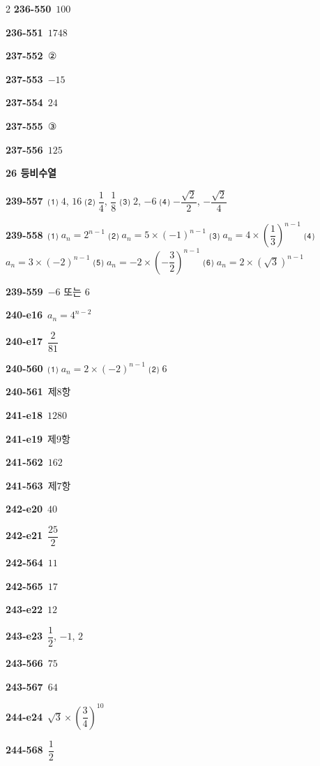 \documentclass[10pt,a4paper]{article}
\begin{document}
\begin{multicols}{2}
\noindent\textbf{236-550}\ $100$\par
\noindent\textbf{236-551}\ $1748$\par
\noindent\textbf{237-552}\ ②\par
\noindent\textbf{237-553}\ $-15$\par
\noindent\textbf{237-554}\ $24$\par
\noindent\textbf{237-555}\ ③\par
\noindent\textbf{237-556}\ $125$\par
\noindent\textbf{26 등비수열}\par\smallskip
\noindent\textbf{239-557}\ ⑴ $4$, $16$ ⑵ $\dfrac{1}{4}$, $\dfrac{1}{8}$ ⑶ $2$, $-6$ ⑷ $-\dfrac{\sqrt{2}}{2}$, $-\dfrac{\sqrt{2}}{4}$\par
\noindent\textbf{239-558}\ ⑴ $a_n=2^{n-1}$ ⑵ $a_n=5\times(-1)^{n-1}$ ⑶ $a_n=4\times\left(\dfrac{1}{3}\right)^{n-1}$ ⑷ $a_n=3\times(-2)^{n-1}$ ⑸ $a_n=-2\times\left(-\dfrac{3}{2}\right)^{n-1}$ ⑹ $a_n=2\times(\sqrt{3})^{n-1}$\par
\noindent\textbf{239-559}\ $-6$ 또는 $6$\par
\noindent\textbf{240-e16}\ $a_n=4^{n-2}$\par
\noindent\textbf{240-e17}\ $\dfrac{2}{81}$\par
\noindent\textbf{240-560}\ ⑴ $a_n=2\times(-2)^{n-1}$ ⑵ $6$\par
\noindent\textbf{240-561}\ 제$8$항\par
\noindent\textbf{241-e18}\ $1280$\par
\noindent\textbf{241-e19}\ 제$9$항\par
\noindent\textbf{241-562}\ $162$\par
\noindent\textbf{241-563}\ 제$7$항\par
\noindent\textbf{242-e20}\ $40$\par
\noindent\textbf{242-e21}\ $\dfrac{25}{2}$\par
\noindent\textbf{242-564}\ $11$\par
\noindent\textbf{242-565}\ $17$\par
\noindent\textbf{243-e22}\ $12$\par
\noindent\textbf{243-e23}\ $\dfrac{1}{2}$, $-1$, $2$\par
\noindent\textbf{243-566}\ $75$\par
\noindent\textbf{243-567}\ $64$\par
\noindent\textbf{244-e24}\ $\sqrt{3}\times\left(\dfrac{3}{4}\right)^{10}$\par
\noindent\textbf{244-568}\ $\dfrac{1}{2}$\par

\end{multicols}
\end{document}
